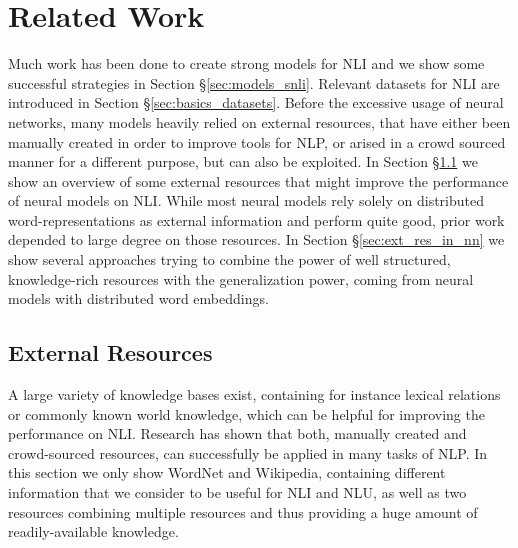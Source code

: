 \section{Related Work}\label{sec:related_work}
Much work has been done to create strong models for \ac{NLI} and we show some successful strategies in Section §\ref{sec:models_snli}. Relevant datasets for \ac{NLI} are introduced in Section §\ref{sec:basics_datasets}. Before the excessive usage of neural networks, many models heavily relied on external resources, that have either been manually created in order to improve tools for \ac{NLP}, or arised in a crowd sourced manner for a different purpose, but can also be exploited. In Section §\ref{sec:ext_resources} we show an overview of some external resources that might improve the performance of neural models on \ac{NLI}. While most neural models rely solely on distributed word-representations as external information and perform quite good, prior work \citep{bos2005recognising,tatu2005semantic} depended to large degree on those resources. In Section §\ref{sec:ext_res_in_nn} we show several approaches trying to combine the power of well structured, knowledge-rich resources with the generalization power, coming from neural models with distributed word embeddings.
\subsection{External Resources}\label{sec:ext_resources}
A large variety of knowledge bases exist, containing for instance lexical relations or commonly known world knowledge, which can be helpful for improving the performance on \ac{NLI}. Research has shown that both, manually created and crowd-sourced resources, can successfully be applied in many tasks of \ac{NLP}. In this section we only show WordNet and Wikipedia, containing different information that we consider to be useful for \ac{NLI} and \ac{NLU}, as well as two resources combining multiple resources and thus providing a huge amount of readily-available knowledge.

